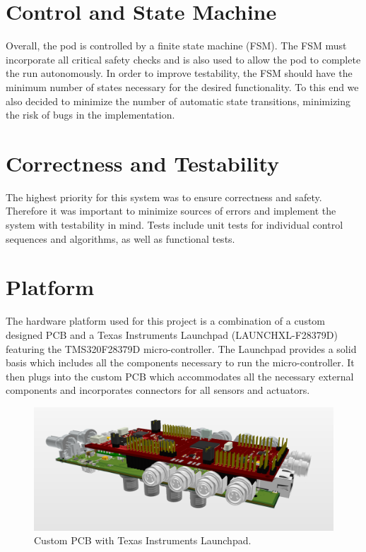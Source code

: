 \section{Control and State Machine}

Overall, the pod is controlled by a finite state machine (FSM). The FSM must incorporate all critical safety checks and is also used to allow the pod to complete the run autonomously. In order to improve testability, the FSM should have the minimum number of states necessary for the desired functionality. To this end we also decided to minimize the number of automatic state transitions, minimizing the risk of bugs in the implementation.

\section{Correctness and Testability}

The highest priority for this system was to ensure correctness and safety. Therefore it was important to minimize sources of errors and implement the system with testability in mind. Tests include unit tests for individual control sequences and algorithms, as well as functional tests.

\section{Platform}

The hardware platform used for this project is a combination of a custom designed PCB and a Texas Instruments Launchpad (LAUNCHXL-F28379D)\cite{launchpad} featuring the TMS320F28379D micro-controller\cite{mcu}. The Launchpad provides a solid basis which includes all the components necessary to run the micro-controller. It then plugs into the custom PCB which accommodates all the necessary external components and incorporates connectors for all sensors and actuators.

\begin{figure}[H]
  \centering \includegraphics[width=1.0\textwidth]{./figures/pcb.png}
  \caption{Custom PCB with Texas Instruments Launchpad.}
\end{figure}

